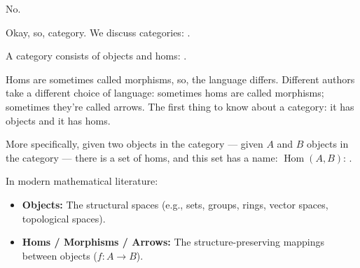\begin{student}
No.
\end{student}

\begin{speech}[01:07:09 - 01:07:57]
Okay, so, category. We discuss categories: .

A category consists of  objects  and homs: .

Homs are sometimes called morphisms,  so, the language differs. Different authors take a different choice of language: sometimes homs are called morphisms; sometimes they're called arrows. The first thing to know about a category: it has objects and it has homs.

More specifically, given two objects in the category ---  given $A$ and $B$ objects in the category --- there is a set of homs, and this set has a name: $\operatorname{Hom}(A, B)$: .
\end{speech}

\begin{content}

\begin{steps}
In modern mathematical literature:
\begin{itemize}
    \item \textbf{Objects:} The structural spaces (e.g., sets, groups, rings, vector spaces, topological spaces).
    \item \textbf{Homs / Morphisms / Arrows:} The structure-preserving mappings between objects ($f \colon A \to B$).
\end{itemize}
\end{steps}
\end{content}

